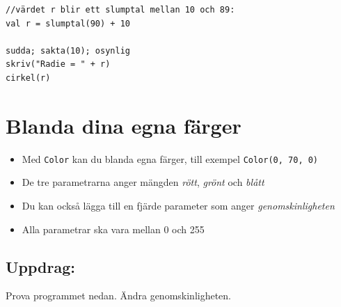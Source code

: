   

\begin{lstlisting}[basicstyle={\ttfamily\fontsize{20}{24}\selectfont},numbers=none]
//värdet r blir ett slumptal mellan 10 och 89:
val r = slumptal(90) + 10   

sudda; sakta(10); osynlig
skriv("Radie = " + r)
cirkel(r)
\end{lstlisting}
        
\chapter{Blanda dina egna färger}

\begin{itemize}

\item {Med \lstinline{Color} kan du blanda egna färger, till exempel \lstinline{Color(0, 70, 0)}}
\item {De tre parametrarna anger mängden {\it rött}, {\it grönt} och {\it blått}}
\item {Du kan också lägga till en fjärde parameter som anger {\it genomskinligheten}}
\item {Alla parametrar ska vara mellan 0 och 255}

\end{itemize}


\section*{\color{BrickRed}Uppdrag:}
Prova programmet nedan. Ändra genomskinligheten.

